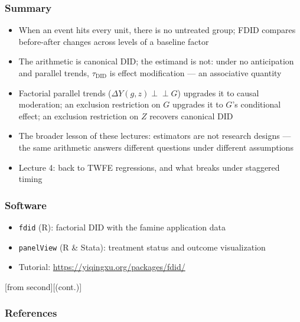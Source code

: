 \documentclass[xcolor=svgnames,9pt,english, aspectratio=169]{beamer}
\newcommand{\indep}{{\perp\!\!\!\perp}}
\newcommand{\tdid}{\ensuremath{\tau_{\mathrm{DID}}}}
\begin{document}
\begin{frame}
  \frametitle{Summary}
\begin{itemize}[<+->]\itemsep1.1em
\item When an event hits every unit, there is no untreated group; FDID compares before-after changes across levels of a \alert{baseline factor}
\item The arithmetic is canonical DID; the estimand is not: under no anticipation and parallel trends, $\tdid$ is \alert{effect modification} --- an associative quantity
\item \alert{Factorial parallel trends} ($\Delta Y(g,z) \indep G$) upgrades it to \alert{causal moderation}; an exclusion restriction on $G$ upgrades it to $G$'s conditional effect; an exclusion restriction on $Z$ recovers canonical DID
\item The broader lesson of these lectures: \alert{estimators are not research designs} --- the same arithmetic answers different questions under different assumptions
\item Lecture 4: back to TWFE regressions, and what breaks under staggered timing
\end{itemize}
\end{frame}

\begin{frame}
  \frametitle{Software}
\begin{itemize}\itemsep0.5em
\item \texttt{fdid} (R): factorial DID with the famine application data
\item \texttt{panelView} (R \& Stata): treatment status and outcome visualization
\item Tutorial: \url{https://yiqingxu.org/packages/fdid/}
\end{itemize}
\end{frame}

\appendix

[from second][(cont.)]
\begin{frame}[t,allowframebreaks=1.0]
  \frametitle{References}
\end{frame}
\end{document}
